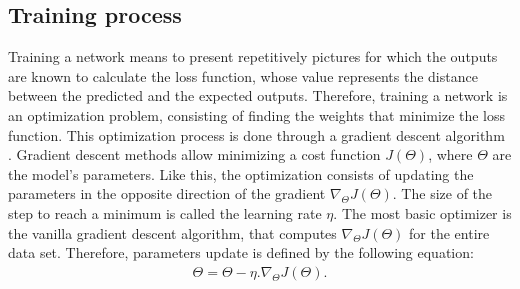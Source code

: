 \documentclass[12pt, french, a4paper]{article} %
\begin{document}
\subsection{Training process}
Training a network means to present repetitively pictures for which the outputs are known to calculate the loss function, whose value represents the distance between the predicted and the expected outputs. Therefore, training a network is an optimization problem, consisting of finding the weights that minimize the loss function. This optimization process is done through a gradient descent algorithm \cite{ruder2016overview}. Gradient descent methods allow minimizing a cost function $J(\Theta)$, where $\Theta$ are the model's parameters. Like this, the optimization consists of updating the parameters in the opposite direction of the gradient $\nabla_\Theta J(\Theta)$. The size of the step to reach a minimum is called the learning rate $\eta$. The most basic optimizer is the vanilla gradient descent algorithm, that computes $\nabla_\Theta J(\Theta)$ for the entire data set. Therefore, parameters update is defined by the following equation:
\begin{align}
 \Theta = \Theta - \eta.\nabla_\Theta J(\Theta).
\end{align}
\end{document}
